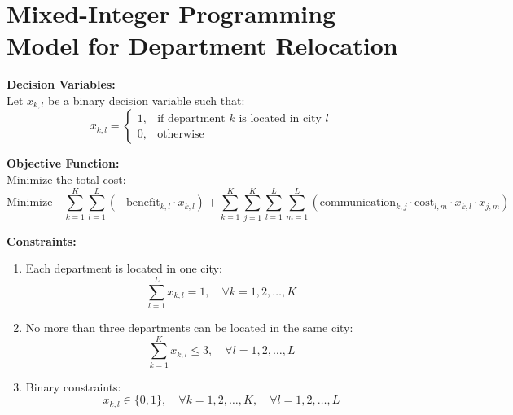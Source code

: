 \documentclass{article}
\begin{document}
\section*{Mixed-Integer Programming Model for Department Relocation}

\textbf{Decision Variables:}\\
Let \( x_{k, l} \) be a binary decision variable such that:
\[
x_{k, l} = 
\begin{cases} 
1, & \text{if department } k \text{ is located in city } l \\
0, & \text{otherwise}
\end{cases}
\]

\textbf{Objective Function:}\\
Minimize the total cost:
\[
\text{Minimize} \quad \sum_{k=1}^{K} \sum_{l=1}^{L} \left(-\text{benefit}_{k, l} \cdot x_{k, l}\right) + \sum_{k=1}^{K} \sum_{j=1}^{K} \sum_{l=1}^{L} \sum_{m=1}^{L} \left(\text{communication}_{k, j} \cdot \text{cost}_{l, m} \cdot x_{k, l} \cdot x_{j, m}\right)
\]

\textbf{Constraints:}
\begin{enumerate}
    \item Each department is located in one city:
    \[
    \sum_{l=1}^{L} x_{k, l} = 1, \quad \forall k = 1, 2, \ldots, K
    \]
    
    \item No more than three departments can be located in the same city:
    \[
    \sum_{k=1}^{K} x_{k, l} \leq 3, \quad \forall l = 1, 2, \ldots, L
    \]
    
    \item Binary constraints:
    \[
    x_{k, l} \in \{0, 1\}, \quad \forall k = 1, 2, \ldots, K, \quad \forall l = 1, 2, \ldots, L
    \]
\end{enumerate}
\end{document}

